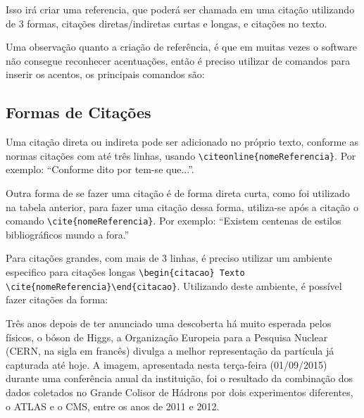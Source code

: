 Isso irá criar uma referencia, que poderá ser chamada em uma citação utilizando de 3 formas, citações diretas/indiretas curtas e longas, e  citações no texto.

Uma observação quanto a criação de referência, é que em muitas vezes o software não consegue reconhecer acentuações, então é preciso utilizar de comandos para inserir os acentos, os principais comandos são:
\begin{table}[htb]
\end{table}
\subsection{Formas de Citações}
Uma citação direta ou indireta pode ser adicionado no próprio texto, conforme as normas citações com até três linhas, usando \lstinline|\citeonline{nomeReferencia}|. Por exemplo: ``Conforme dito por  tem-se que...''.

Outra forma de se fazer uma citação é de forma direta curta, como foi utilizado na tabela anterior, para fazer uma citação dessa forma, utiliza-se após a citação o comando \lstinline|\cite{nomeReferencia}|. Por exemplo: ``Existem centenas de estilos bibliográficos mundo a fora.''\cite{araujo2016}

Para citações grandes, com mais de 3 linhas, é preciso utilizar um ambiente especifico para citações longas \lstinline|\begin{citacao} Texto \cite{nomeReferencia}\end{citacao}|. Utilizando deste ambiente, é possível fazer citações da forma:
\begin{citacao}
	Três anos depois de ter anunciado uma descoberta há muito esperada pelos físicos, o bóson de Higgs, a Organização Europeia para a Pesquisa Nuclear (CERN, na sigla em francês) divulga a melhor representação da partícula já capturada até hoje. A imagem, apresentada nesta terça-feira (01/09/2015) durante uma conferência anual da instituição, foi o resultado da combinação dos dados coletados no Grande Colisor de Hádrons por dois experimentos diferentes, o ATLAS e o CMS, entre os anos de 2011 e 2012. \cite{oliveira2015}
\end{citacao}

